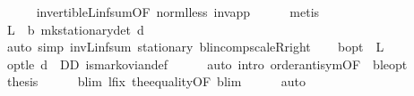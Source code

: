 \begin{isabellebody}
\ \ \ \ \isamarkupfalse%
\ invertible\isactrlsub L{\isacharunderscore}{\kern0pt}inf{\isacharunderscore}{\kern0pt}sum{\isacharbrackleft}{\kern0pt}OF\ norm{\isacharunderscore}{\kern0pt}{\isasymP}l{\isacharunderscore}{\kern0pt}less{\isacharbrackright}{\kern0pt}\ inv{\isacharunderscore}{\kern0pt}app{}{\isacharprime}{\kern0pt}\isanewline
\ \ \ \ \isamarkupfalse%
\ metis\isanewline
\ \ \isamarkupfalse%
\ {\isachardoublequoteopen}L\ {\isacharequal}{\kern0pt}\ {\isasymnu}\isactrlsub b\ {\isacharparenleft}{\kern0pt}mk{\isacharunderscore}{\kern0pt}stationary{\isacharunderscore}{\kern0pt}det\ d{\isacharparenright}{\kern0pt}{\isachardoublequoteclose}\isanewline
\ \ \ \ \isamarkupfalse%
\ {\isacharparenleft}{\kern0pt}auto\ simp{\isacharcolon}{\kern0pt}\ inv\isactrlsub L{\isacharunderscore}{\kern0pt}inf{\isacharunderscore}{\kern0pt}sum\ {\isasymnu}{\isacharunderscore}{\kern0pt}stationary\ blincomp{\isacharunderscore}{\kern0pt}scaleR{\isacharunderscore}{\kern0pt}right{\isacharparenright}{\kern0pt}\isanewline
\ \ \isamarkupfalse%
\ {\isachardoublequoteopen}{\isasymnu}\isactrlsub b{\isacharunderscore}{\kern0pt}opt\ {\isacharequal}{\kern0pt}\ L{\isachardoublequoteclose}\isanewline
\ \ \ \ \isamarkupfalse%
\ opt{\isacharunderscore}{\kern0pt}le\ {\isacartoucheopen}d\ {\isasymin}\ D\isactrlsub D{\isacartoucheclose}\ is{\isacharunderscore}{\kern0pt}markovian{\isacharunderscore}{\kern0pt}def\isanewline
\ \ \ \ \isamarkupfalse%
\ {\isacharparenleft}{\kern0pt}auto\ intro{\isacharcolon}{\kern0pt}\ order{\isachardot}{\kern0pt}antisym{\isacharbrackleft}{\kern0pt}OF\ {\isacharunderscore}{\kern0pt}\ {\isasymnu}\isactrlsub b{\isacharunderscore}{\kern0pt}le{\isacharunderscore}{\kern0pt}opt{\isacharbrackright}{\kern0pt}{\isacharparenright}{\kern0pt}\isanewline
\ \ \isamarkupfalse%
\ {\isacharquery}{\kern0pt}thesis\isanewline
\ \ \ \ \isamarkupfalse%
\ {\isasymL}\isactrlsub b{\isacharunderscore}{\kern0pt}lim\ l{\isacharunderscore}{\kern0pt}fix\ the{}{\isacharunderscore}{\kern0pt}equality{\isacharbrackleft}{\kern0pt}OF\ {\isasymL}\isactrlsub b{\isacharunderscore}{\kern0pt}lim{\isacharparenleft}{\kern0pt}{}{\isacharparenright}{\kern0pt}{\isacharbrackright}{\kern0pt}\isanewline
\ \ \ \ \isamarkupfalse%
\ auto\isanewline
{}\isamarkupfalse%
%
\endisatagproof
{\isafoldproof}%
%
\isadelimproof
\isanewline
%
\endisadelimproof
\isanewline

\end{isabellebody}
